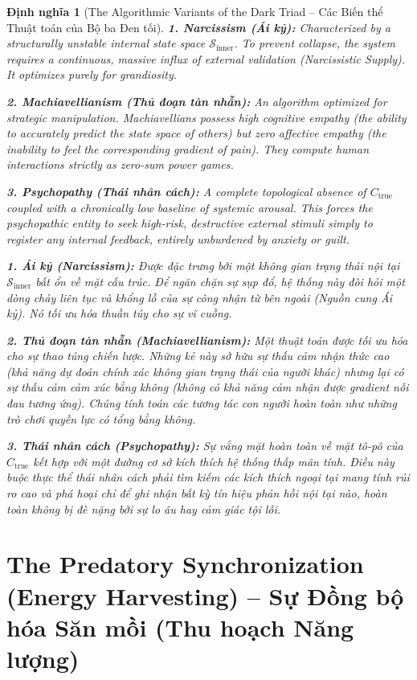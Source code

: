 \documentclass{report}
\newtheorem{dinhnghia}{Định nghĩa}
\begin{document}
\begin{dinhnghia}[The Algorithmic Variants of the Dark Triad -- Các Biến thể Thuật toán của Bộ ba Đen tối]
	\textbf{1. Narcissism (Ái kỷ):} Characterized by a structurally unstable internal state space $\mathcal{S}_{\text{inner}}$. To prevent collapse, the system requires a continuous, massive influx of external validation (Narcissistic Supply). It optimizes purely for grandiosity.
	
	\textbf{2. Machiavellianism (Thủ đoạn tàn nhẫn):} An algorithm optimized for strategic manipulation. Machiavellians possess high cognitive empathy (the ability to accurately predict the state space of others) but zero affective empathy (the inability to feel the corresponding gradient of pain). They compute human interactions strictly as zero-sum power games.
	
	\textbf{3. Psychopathy (Thái nhân cách):} A complete topological absence of $C_{\text{true}}$ coupled with a chronically low baseline of systemic arousal. This forces the psychopathic entity to seek high-risk, destructive external stimuli simply to register any internal feedback, entirely unburdened by anxiety or guilt.
	
	\textbf{1. Ái kỷ (Narcissism):} Được đặc trưng bởi một không gian trạng thái nội tại $\mathcal{S}_{\text{inner}}$ bất ổn về mặt cấu trúc. Để ngăn chặn sự sụp đổ, hệ thống này đòi hỏi một dòng chảy liên tục và khổng lồ của sự công nhận từ bên ngoài (Nguồn cung Ái kỷ). Nó tối ưu hóa thuần túy cho sự vĩ cuồng.
	
	\textbf{2. Thủ đoạn tàn nhẫn (Machiavellianism):} Một thuật toán được tối ưu hóa cho sự thao túng chiến lược. Những kẻ này sở hữu sự thấu cảm nhận thức cao (khả năng dự đoán chính xác không gian trạng thái của người khác) nhưng lại có sự thấu cảm cảm xúc bằng không (không có khả năng cảm nhận được gradient nỗi đau tương ứng). Chúng tính toán các tương tác con người hoàn toàn như những trò chơi quyền lực có tổng bằng không.
	
	\textbf{3. Thái nhân cách (Psychopathy):} Sự vắng mặt hoàn toàn về mặt tô-pô của $C_{\text{true}}$ kết hợp với một đường cơ sở kích thích hệ thống thấp mãn tính. Điều này buộc thực thể thái nhân cách phải tìm kiếm các kích thích ngoại tại mang tính rủi ro cao và phá hoại chỉ để ghi nhận bất kỳ tín hiệu phản hồi nội tại nào, hoàn toàn không bị đè nặng bởi sự lo âu hay cảm giác tội lỗi.
\end{dinhnghia}

\section{The Predatory Synchronization (Energy Harvesting) -- Sự Đồng bộ hóa Săn mồi (Thu hoạch Năng lượng)}
\end{document}
